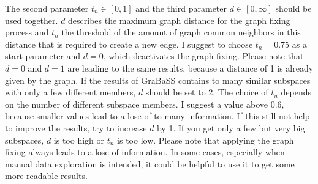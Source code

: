 The second parameter $t_n \in [0,1]$ and the third parameter $d \in [0,\infty]$ should be used together. $d$ describes the maximum graph distance for the graph fixing process and $t_n$ the threshold of the amount of graph common neighbors in this distance that is required to create a new edge. I suggest to choose $t_n = 0.75$ as a start parameter and $d = 0$, which deactivates the graph fixing. Please note that $d=0$ and $d=1$ are leading to the same results, because a distance of \num{1} is already given by the graph. If the results of GraBaSS contains to many similar subspaces with only a few different members, $d$ should be set to \num{2}. The choice of $t_n$ depends on the number of different subspace members. I suggest a value above \num{0.6}, because smaller values lead to a lose of to many information. If this still not help to improve the results, try to increase $d$ by \num{1}. If you get only a few but very big subspaces, $d$ is too high or $t_n$ is too low. Please note that applying the graph fixing always leads to a lose of information. In some cases, especially when manual data exploration is intended, it could be helpful to use it to get some more readable results.
